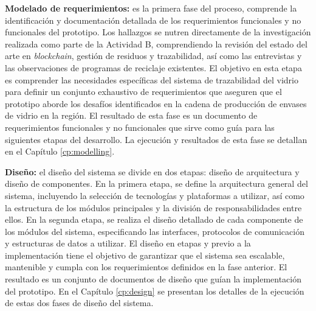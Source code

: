 \textbf{Modelado de requerimientos:}
es la primera fase del proceso, comprende la identificación y documentación detallada de los requerimientos funcionales y no funcionales del prototipo.
Los hallazgos se nutren directamente de la investigación realizada como parte de la Actividad B, comprendiendo la revisión del estado del arte en \textit{blockchain}, gestión de residuos y trazabilidad, así como las entrevistas y las observaciones de programas de reciclaje existentes.
El objetivo en esta etapa es comprender las necesidades específicas del sistema de trazabilidad del vidrio para definir un conjunto exhaustivo de requerimientos que aseguren que el prototipo aborde los desafíos identificados en la cadena de producción de envases de vidrio en la región.
El resultado de esta fase es un documento de requerimientos funcionales y no funcionales que sirve como guía para las siguientes etapas del desarrollo.
La ejecución y resultados de esta fase se detallan en el Capítulo \ref{cp:modelling}.

\textbf{Diseño:}
el diseño del sistema se divide en dos etapas: diseño de arquitectura y diseño de componentes.
En la primera etapa, se define la arquitectura general del sistema, incluyendo la selección de tecnologías y plataformas a utilizar, así como la estructura de los módulos principales y la división de responsabilidades entre ellos.
En la segunda etapa, se realiza el diseño detallado de cada componente de los módulos del sistema, especificando las interfaces, protocolos de comunicación y estructuras de datos a utilizar.
El diseño en etapas y previo a la implementación tiene el objetivo de garantizar que el sistema sea escalable, mantenible y cumpla con los requerimientos definidos en la fase anterior.
El resultado es un conjunto de documentos de diseño que guían la implementación del prototipo. En el Capítulo \ref{cp:design} se presentan los detalles de la ejecución de estas dos fases de diseño del sistema.

